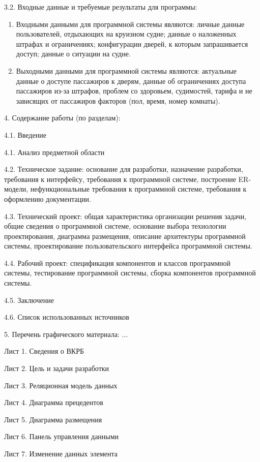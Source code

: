 {\parindent0pt
  3.2. Входные данные и требуемые результаты для программы:}

\begin{enumerate}
\item Входными данными для программной системы являются: личные данные пользователей, отдыхающих на круизном судне; данные о наложенных штрафах и ограничениях; конфигурации дверей, к которым запрашивается доступ; данные о ситуации на судне.
\item Выходными данными для программной системы являются: актуальные данные о доступе пассажиров к дверям, данные об ограничениях доступа пассажиров из-за штрафов, проблем со здоровьем, судимостей, тарифа и не зависящих от пассажиров факторов (пол, время, номер комнаты).
\end{enumerate}

{\parindent0pt

  4. Содержание работы (по разделам):
  
  4.1. Введение
  
  4.1. Анализ предметной области
  
4.2. Техническое задание: основание для разработки, назначение разработки, требования к интерфейсу,
требования к программной системе, построение ER-модели, нефункциональные требования к программной системе, требования к оформлению документации.

4.3. Технический проект: общая характеристика организации решения задачи, общие сведения о программной системе, основание выбора технологии проектирования, диаграмма размещения, описание архитектуры программной системы, проектирование пользовательского интерфейса программной системы.

4.4. Рабочий проект: спецификация компонентов и классов программной системы, тестирование программной системы, сборка компонентов программной системы.

4.5. Заключение

4.6. Список использованных источников

5. Перечень графического материала: ...

Лист 1. Сведения о ВКРБ

Лист 2. Цель и задачи разработки

Лист 3. Реляционная модель данных

Лист 4. Диаграмма прецедентов

Лист 5. Диаграмма размещения

Лист 6. Панель управления данными

Лист 7. Изменение данных элемента

}
